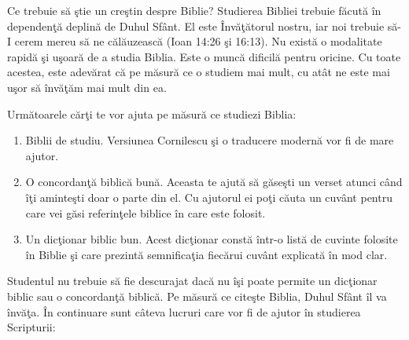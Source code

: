 \newpage


Ce trebuie să ştie un creştin despre Biblie? Studierea Bibliei trebuie făcută în dependenţă deplină de Duhul Sfânt. El este Învăţătorul nostru, iar noi trebuie să-I cerem mereu să ne călăuzească (Ioan 14:26 şi 16:13). Nu există o modalitate rapidă şi uşoară de a studia Biblia. Este o muncă dificilă pentru oricine. Cu toate acestea, este adevărat că pe măsură ce o studiem mai mult, cu atât ne este mai uşor să învăţăm mai mult din ea. 

Următoarele cărţi te vor ajuta pe măsură ce studiezi Biblia:

\begin{enumerate}

	\item Biblii de studiu. Versiunea Cornilescu şi o traducere modernă vor fi de mare ajutor.
	\item O concordanţă biblică bună. Aceasta te ajută să găseşti un verset atunci când îţi aminteşti doar o parte din el. Cu ajutorul ei poţi căuta un cuvânt pentru care vei găsi referinţele biblice în care este folosit. 
	\item Un dicţionar biblic bun. Acest dicţionar constă într-o listă de cuvinte folosite în Biblie şi care prezintă semnificaţia fiecărui cuvânt explicată în mod clar. 
	
\end{enumerate}

Studentul nu trebuie să fie descurajat dacă nu îşi poate permite un dicţionar biblic sau o concordanţă biblică. Pe măsură ce citeşte Biblia, Duhul Sfânt îl va învăţa. În continuare sunt câteva lucruri care vor fi de ajutor în studierea Scripturii:


